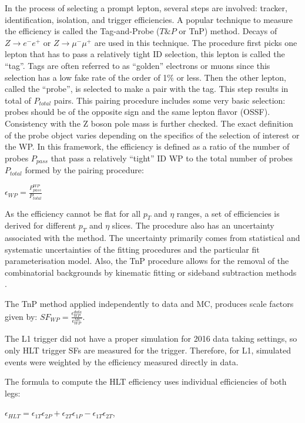 In the process of selecting a prompt lepton, several steps are involved: tracker, identification, isolation, and trigger efficiencies. A popular technique to measure the efficiency is called the Tag-and-Probe ($T\&P$ or TnP) method. Decays of $Z \rightarrow e^- e^+$ or $Z \rightarrow \mu^- \mu^+$ are used in this technique. The procedure first picks one lepton that has to pass a relatively tight ID selection, this lepton is called the ``tag''. Tags are often referred to as ``golden'' electrons or muons since this selection has a low fake rate of the order of 1$\%$ or less. Then the other lepton, called the ``probe'', is selected to make a pair with the tag. This step results in total of $P_{total}$ pairs. This pairing procedure includes some very basic selection:  probes should be of the opposite sign and the same lepton flavor (OSSF). Consistency with the Z boson pole mass is further checked. The exact definition of the probe object varies depending on the specifics of the selection of interest or the WP. In this framework, the efficiency is defined as a ratio of the number of probes $P_{pass}$ that pass a relatively ``tight'' ID WP to the total number of probes $P_{total}$ formed by the pairing procedure:

$\epsilon_{WP} = \frac{P^{WP} _{pass}}{P_{total}} $

As the efficiency cannot be flat for all $p_T$ and $\eta$ ranges, a set of efficiencies is derived for different $p_T$ and $\eta$ slices. The procedure also has an uncertainty associated with the method. The uncertainty primarily comes from statistical and systematic uncertainties of the fitting procedures and the particular fit parameterisation model. Also, the TnP procedure allows for the removal of the combinatorial backgrounds by kinematic fitting or sideband subtraction methods \cite{TnP}. 

The TnP method applied independently to data and MC, produces scale factors given by:
$SF_{WP} = \frac{\epsilon^{data}_{WP}}{\epsilon^{MC}_{WP}}$.

The L1 trigger did not have a proper simulation for 2016 data taking settings, so only HLT trigger SFs are measured for the trigger. Therefore, for L1, simulated events were weighted by the efficiency measured directly in data. 

The formula to compute the HLT efficiency uses individual efficiencies of both legs:

$\epsilon_{HLT} = \epsilon_{1T}\epsilon_{2P} + \epsilon_{2T}\epsilon_{1P} - \epsilon_{1T}\epsilon_{2T}$,


